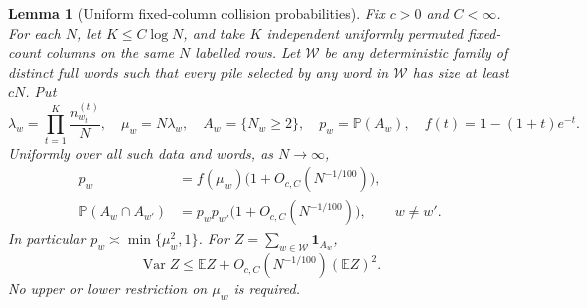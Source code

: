 \documentclass[11pt]{article}
\numberwithin{equation}{section}
\newtheorem{lemma}[lemma]{Lemma}
\newcommand{\E}{\mathbb E}
\newcommand{\Pp}{\mathbb P}
\newcommand{\Var}{\operatorname{Var}}
\newcommand{\1}{\mathbf 1}
\begin{document}
\begin{lemma}[Uniform fixed-column collision probabilities]
\label{lem:two-category-poisson}
Fix $c>0$ and $C<\infty$. For each $N$, let $K\le C\log N$, and take $K$
independent uniformly permuted fixed-count columns on the same $N$ labelled
rows. Let $\mathcal W$ be any deterministic family of distinct full words
such that every pile selected by any word in $\mathcal W$ has size at least
$cN$. Put
\[
 \lambda_w=\prod_{t=1}^{K}\frac{n_{w_t}^{(t)}}N,
 \quad \mu_w=N\lambda_w,
 \quad A_w=\{N_w\ge2\},\quad p_w=\Pp(A_w),
 \quad f(t)=1-(1+t)e^{-t}.
\]
Uniformly over all such data and words, as $N\to\infty$,
\begin{align}
 p_w&=f(\mu_w)\bigl(1+O_{c,C}(N^{-1/100})\bigr),
 \label{eq:uniform-collision-marginal}\\
 \Pp(A_w\cap A_{w'})
 &=p_wp_{w'}\bigl(1+O_{c,C}(N^{-1/100})\bigr),\qquad w\ne w'.
 \label{eq:uniform-collision-pair}
\end{align}
In particular $p_w\asymp\min\{\mu_w^2,1\}$. For
$Z=\sum_{w\in\mathcal W}\1_{A_w}$,
\begin{equation}
\label{eq:uniform-collision-variance}
 \Var Z\le\E Z+O_{c,C}(N^{-1/100})(\E Z)^2.
\end{equation}
No upper or lower restriction on $\mu_w$ is required.
\end{lemma}
\end{document}
